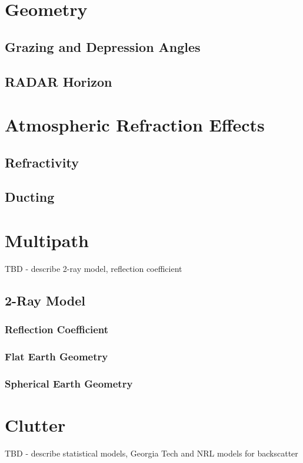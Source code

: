 \section{Geometry}
\subsection{Grazing and Depression Angles}
\subsection{RADAR Horizon}

\section{Atmospheric Refraction Effects}
\subsection{Refractivity}

\subsection{Ducting}

\section{Multipath}
TBD - describe 2-ray model, reflection coefficient
\subsection{2-Ray Model}
\subsubsection{Reflection Coefficient}
\subsubsection{Flat Earth Geometry}
\subsubsection{Spherical Earth Geometry}

\section{Clutter}
TBD - describe statistical models, Georgia Tech and NRL models for backscatter

